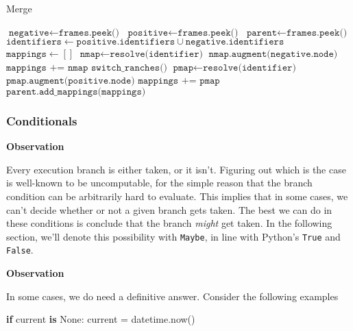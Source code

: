 \documentclass[]{article}
\newenvironment{Shaded}{}{}
\newcommand{\KeywordTok}[1]{\textcolor[rgb]{0.00,0.44,0.13}{\textbf{#1}}}
\newcommand{\VariableTok}[1]{\textcolor[rgb]{0.10,0.09,0.49}{#1}}
\newcommand{\ControlFlowTok}[1]{\textcolor[rgb]{0.00,0.44,0.13}{\textbf{#1}}}
\newcommand{\OperatorTok}[1]{\textcolor[rgb]{0.40,0.40,0.40}{#1}}
\newcommand{\NormalTok}[1]{#1}
\begin{document}
\begin{algorithm}
    \caption{Merge}\label{alg:merge}
    \begin{algorithmic}[1]
         {}
          \State $\texttt{negative} \gets \texttt{frames.peek()}$
          \State $\texttt{positive} \gets \texttt{frames.peek()}$
          \State $\texttt{parent} \gets \texttt{frames.peek()}$
          \State $\texttt{identifiers} \gets \texttt{positive.identifiers} \cup \texttt{negative.identifiers}$
          \State $\texttt{mappings} \gets []$
            \State $\texttt{nmap} \gets \texttt{resolve(identifier)}$
            \State $\texttt{nmap.augment(negative.node)}$
            \State $\texttt{mappings += nmap}$
          \EndFor
          \State $\texttt{switch\_ranches()}$
            \State $\texttt{pmap} \gets \texttt{resolve(identifier)}$
            \State $\texttt{pmap.augment(positive.node)}$
            \State $\texttt{mappings += pmap}$
          \EndFor
          \State $\texttt{parent.add\_mappings(mappings)}$
        \EndFunction
    \end{algorithmic}
\end{algorithm}

\subsubsection{Conditionals}\label{conditionals}

\textbf{Observation}

Every execution branch is either taken, or it isn't. Figuring out which
is the case is well-known to be uncomputable, for the simple reason that
the branch condition can be arbitrarily hard to evaluate. This implies
that in some cases, we can't decide whether or not a given branch gets
taken. The best we can do in these conditions is conclude that the
branch \emph{might} get taken. In the following section, we'll denote
this possibility with \texttt{Maybe}, in line with Python's
\texttt{True} and \texttt{False}.

\textbf{Observation}

In some cases, we do need a definitive answer. Consider the following
examples

\begin{Shaded}
\begin{Highlighting}[]
\ControlFlowTok{if}\NormalTok{ current }\KeywordTok{is} \VariableTok{None}\NormalTok{:}
\NormalTok{  current }\OperatorTok{=}\NormalTok{ datetime.now()}
\end{Highlighting}
\end{Shaded}
\end{document}
